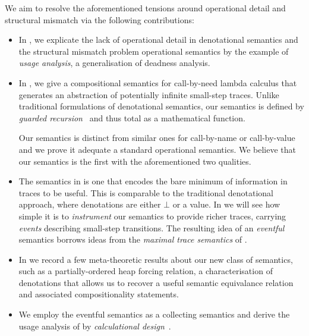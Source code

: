 We aim to resolve the aforementioned tensions around operational
detail and structural mismatch via the following contributions:
\begin{itemize}
  \item In , we explicate the lack of operational detail in
    denotational semantics and the structural mismatch problem \wrt operational
    semantics by the example of \emph{usage analysis}, a generalisation of
    deadness analysis.
  \item In , we give a compositional semantics
    for call-by-need lambda calculus that generates an abstraction of
    potentially infinite small-step traces.
    Unlike traditional formulations of denotational semantics, our semantics
    is defined by \emph{guarded recursion}~\citep{gdtt} and thus total as a
    mathematical function.

    Our semantics is distinct from similar ones for call-by-name or
    call-by-value and we prove it adequate \wrt a standard operational semantics.
    We believe that our semantics is the first with the aforementioned two
    qualities.
  \item The semantics in  is one that encodes the bare minimum
    of information in traces to be useful.
    This is comparable to the traditional denotational approach, where
    denotations are either $\bot$ or a value.
    In  we will see how simple it is to \emph{instrument} our
    semantics to provide richer traces, carrying \emph{events} describing
    small-step transitions.
    The resulting idea of an \emph{eventful} semantics borrows ideas from the
    \emph{maximal trace semantics} of \citet{Cousot:21}.
  \item In  we record a few meta-theoretic results about our
    new class of semantics, such as a partially-ordered heap forcing relation,
    a characterisation of denotations that allows us to recover a useful
    semantic equivalance relation and associated compositionality statements.
  \item We employ the eventful semantics as a collecting semantics and derive
    the usage analysis of  by \emph{calculational design}~\citep{Cousot:21}.
\end{itemize}


